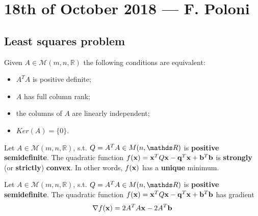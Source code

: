 \documentclass[computationalMathematics.tex]{subfiles}
\begin{document}
\chapter{18th of October 2018 --- F. Poloni}


\section{Least squares problem}
\begin{proposition}
  Given $A \in \mathcal{M}(m, n, \mathds{R})$ the following conditions are equivalent:
  \begin{itemize}
    \item ${A}^{T}A$ is positive definite;
    \item $A$ has full column rank;
    \item the columns of $A$ are linearly independent;
    \item $Ker(A) = \{0\}$.
  \end{itemize}
\end{proposition}

\begin{proposition}
  Let $A \in \mathcal{M}(m, n, \mathds{R})$, s.t. $Q = \tr{A} A \in M(n, \R)$ is \textbf{positive semidefinite}.
  The quadratic function $f({\bf x }) = {{\bf x }}^{T}Q{\bf x } -{{\bf q }}^{T}{\bf x } +{{\bf b }}^{T}{\bf b }$ is \textbf{strongly} (or \textbf{strictly}) \textbf{convex}.
  In other words, $f({\bf x })$ has a \textbf{unique} minimum.
\end{proposition}

\begin{proposition}
	Let $A \in \mathcal{M}(m, n, \mathds{R})$, s.t. $Q = \tr{A} A \in M(n, \R)$ is \textbf{positive semidefinite}.
	The quadratic function $f({\bf x }) = {{\bf x }}^{T}Q{\bf x } -{{\bf q }}^{T}{\bf x } +{{\bf b }}^{T}{\bf b }$ has gradient
	\[
		\nabla  f({\bf x }) = 2 {A}^{T}A{\bf x } - 2{A}^{T}{\bf b }
	\]
\end{proposition}
\end{document}
